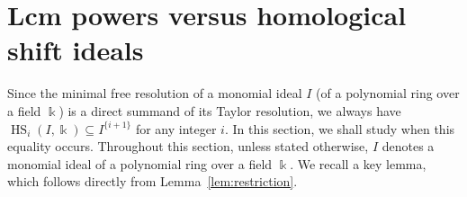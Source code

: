 \documentclass[reqno]{amsart}
\DeclareMathOperator{\pdim}{pdim}
\DeclareMathOperator{\HS}{HS}
\newtheorem{theorem}{Theorem}[section]
\theoremstyle{definition}
\theoremstyle{remark}
\numberwithin{equation}{section}
\begin{document}
    




\section{Lcm powers versus homological shift ideals}

Since the minimal free resolution of a monomial ideal $I$ (of a polynomial ring over a field $\Bbbk$) is a direct summand of its Taylor resolution, we always have $\HS_i(I,\Bbbk)\subseteq I^{\{i+1\}}$ for any integer $i$. In this section, we shall study when this equality occurs. Throughout  this section, unless stated otherwise, $I$ denotes a monomial ideal of a polynomial ring over a field $\Bbbk$. We recall a  key lemma, which follows directly from Lemma~\ref{lem:restriction}.
\end{document}
